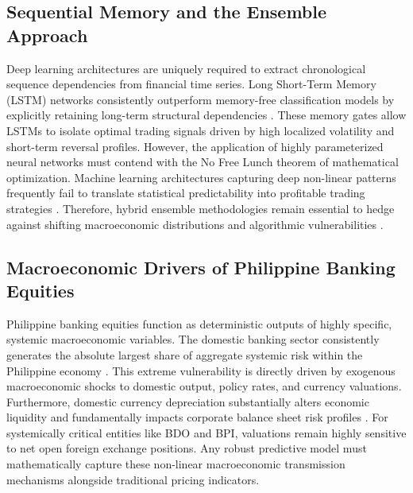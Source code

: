 \documentclass[12pt]{article}
\begin{document}
\subsection{Sequential Memory and the Ensemble Approach}
Deep learning architectures are uniquely required to extract chronological sequence dependencies from financial time series. Long Short-Term Memory (LSTM) networks consistently outperform memory-free classification models by explicitly retaining long-term structural dependencies \parencite{fischer2018deep}. These memory gates allow LSTMs to isolate optimal trading signals driven by high localized volatility and short-term reversal profiles. However, the application of highly parameterized neural networks must contend with the No Free Lunch theorem of mathematical optimization. Machine learning architectures capturing deep non-linear patterns frequently fail to translate statistical predictability into profitable trading strategies \parencite{bustos2025machine}. Therefore, hybrid ensemble methodologies remain essential to hedge against shifting macroeconomic distributions and algorithmic vulnerabilities \parencite{waldow2021machine}.

\subsection{Macroeconomic Drivers of Philippine Banking Equities}
Philippine banking equities function as deterministic outputs of highly specific, systemic macroeconomic variables. The domestic banking sector consistently generates the absolute largest share of aggregate systemic risk within the Philippine economy \parencite{godoy2025measuring}. This extreme vulnerability is directly driven by exogenous macroeconomic shocks to domestic output, policy rates, and currency valuations. Furthermore, domestic currency depreciation substantially alters economic liquidity and fundamentally impacts corporate balance sheet risk profiles \parencite{tancangco2024effects}. For systemically critical entities like BDO and BPI, valuations remain highly sensitive to net open foreign exchange positions. Any robust predictive model must mathematically capture these non-linear macroeconomic transmission mechanisms alongside traditional pricing indicators.
\end{document}
